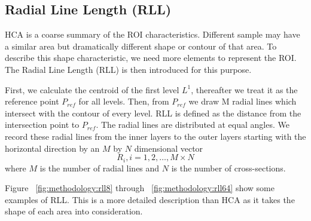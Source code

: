 \subsection{Radial Line Length (RLL)}
\label{ssec:methodology:rll}

HCA is a coarse summary of the ROI characteristics. Different sample may have a similar area but dramatically different shape or contour of that area. To describe this shape characteristic, we need more elements to represent the ROI. The Radial Line Length (RLL) is then introduced for this purpose.

First, we calculate the centroid of the first level  $L^1$, thereafter we treat it as the reference point $P_{ref}$ for all levels. Then, from $P_{ref}$ we draw M radial lines which intersect with the contour of every level. RLL is defined as the distance from the intersection point to $P_{ref}$. The radial lines are distributed at equal angles. We record these radial lines from the inner layers to the outer layers starting with the horizontal direction by an $M$ by $N$ dimensional vector
\begin{equation}
R_i, i=1,2,\dots,M\times N
\end{equation}
where $M$ is the number of radial lines and $N$ is the number of cross-sections.

Figure ~\ref{fig:methodology:rll8} through ~\ref{fig:methodology:rll64} show some examples of RLL. This is a more detailed description than HCA as it takes the shape of each area into consideration.

